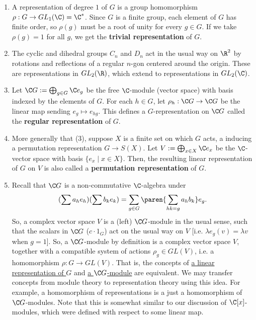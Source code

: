 \begin{ex}
    \begin{enumerate}[(1)]
        \item A representation of degree $1$ of $G$ is a group homomorphism $\rho :G \to GL_1(\C)=\C^*$. Since $G$ is a finite group, each element of $G$ has finite order, so $\rho (g)$ must be a root of unity for every $g \in G$. If we take $\rho (g)=1$ for all $g$, we get the \textbf{trivial representation} of $G$.
        \item The cyclic and dihedral groups $C_n$ and $D_n$ act in the usual way on $\R^2$ by rotations and reflections of a regular $n$-gon centered around the origin. These are representations in $GL_2(\R)$, which extend to representations in $GL_2(\C)$.
        \item Let $\C G:= \bigoplus _{g \in G}\C e_g$ be the free $\C$-module (vector space) with basis indexed by the elements of $G$. For each $h \in G$, let $\rho_h:\C G \to \C G$ be the linear map sending $e_g \mapsto e_{hg}$. This defines a $G$-representation on $\C G$ called the \textbf{regular representation} of $G$.
        \item More generally that (3), suppose $X$ is a finite set on which $G$ acts, a inducing a permutation representation $G \to S(X)$. Let $V := \bigoplus_{x \in X}  \C e_x$ be the $\C$-vector space with basis $\{e_x \mid x \in X\}$. Then, the resulting linear representation of $G$ on $V$ is also called a \textbf{permutation representation} of $G$.
        \item Recall that $\C G$ is a non-commutative $\C$-algebra under
        $$(\sum a_he_h)(\sum b_ke_k)=\sum_{g \in G}\paren{\sum_{hk=g} a_hb_k}e_g.$$
        So, a complex vector space $V$ is a (left) $\C G$-module in the usual sense, such that the scalars in $\C G$ ($c\cdot 1_G$) act on the usual way on $V$ [i.e. $\lambda e_g(v)=\lambda v$ when $g=1$]. So, a $\C G$-module by definition is a complex vector space $V$, together with a compatible system of actions $\rho _g \in GL(V)$, i.e. a homomorphism $\rho :G \to GL(V)$. That is, the concepts of \ul{a linear representation of $G$} and \ul{a $\C G$-module} are equivalent. We may transfer concepts from module theory to representation theory using this idea. For example, a homomorphism of representations is a just a homomorphism of $\C G$-modules. Note that this is somewhat similar to our discussion of $\C[x]$-modules, which were defined with respect to some linear map.
    \end{enumerate}
\end{ex}

